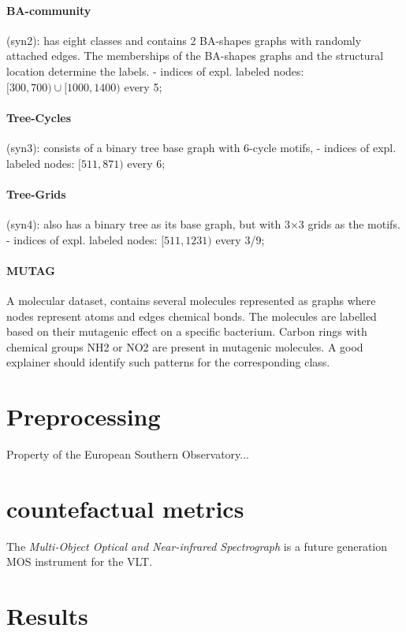 \documentclass[binding=0.6cm]{sapthesis}
\begin{document}
\paragraph{BA-community}
(syn2): has eight classes and contains 2 BA-shapes graphs with randomly attached edges. The memberships of the BA-shapes graphs and the structural location determine the labels.  - indices of expl. labeled nodes: $[300,700) \cup [1000,1400)$ every 5; 

\paragraph{Tree-Cycles}
(syn3): consists of a binary tree base graph with 6-cycle motifs,  - indices of expl. labeled nodes: $[511,871)$ every 6;

\paragraph{Tree-Grids}
(syn4): also has a binary tree as its base graph, but with 3×3 grids as the motifs.  - indices of expl. labeled nodes: $[511,1231)$ every 3/9;

\paragraph{MUTAG}
A molecular dataset, contains several molecules represented as graphs where nodes represent atoms and edges chemical bonds. The molecules are labelled based on their mutagenic effect on a specific bacterium. Carbon rings with chemical groups NH2 or NO2 are present in mutagenic molecules. A good explainer should identify such patterns for the corresponding class.


\section{Preprocessing}
\label{sec:expRes.preprocessing}
Property of the European Southern Observatory...

\section{countefactual metrics}
\label{sec:expRes.cf-metrics}
The \textit{Multi-Object Optical and Near-infrared Spectrograph} is a future generation MOS instrument for the VLT. 

\section{Results}
\label{sec:expRes-res}
\end{document}
